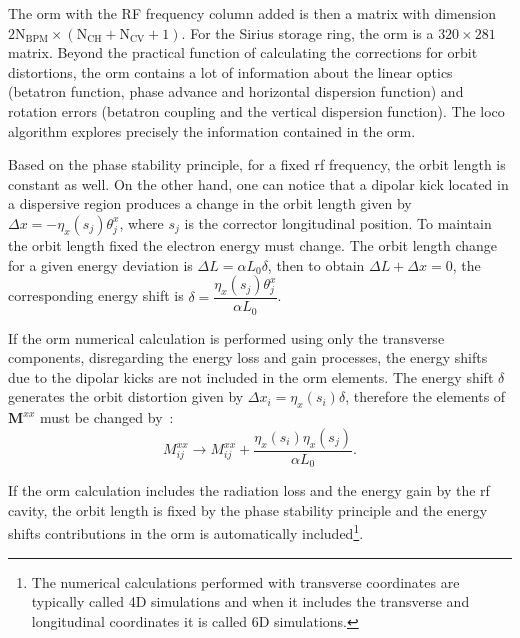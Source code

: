 The \gls{orm} with the RF frequency column added is then a matrix with dimension $2 \mathrm{N}_{\mathrm{BPM}} \times \left(\mathrm{N}_{\mathrm{CH}} + \mathrm{N}_{\mathrm{CV}}+1\right)$. For the Sirius storage ring, the \gls{orm} is a $320 \times 281$ matrix. Beyond the practical function of calculating the corrections for orbit distortions, the \gls{orm} contains a lot of information about the linear optics (betatron function, phase advance and horizontal dispersion function) and rotation errors (betatron coupling and the vertical dispersion function). The \gls{loco} algorithm explores precisely the information contained in the \gls{orm}.

Based on the phase stability principle, for a fixed \gls{rf} frequency, the orbit length is constant as well. On the other hand, one can notice that a dipolar kick located in a dispersive region produces a change in the orbit length given by $\Delta x = -\eta_x(s_j)\theta^x_j$, where $s_j$ is the corrector longitudinal position. To maintain the orbit length fixed the electron energy must change. The orbit length change for a given energy deviation is $\Delta L = \alpha L_0 \delta$, then to obtain $\Delta L + \Delta x = 0$, the corresponding energy shift is $\delta = \dfrac{\eta_x(s_j) \theta^x_j}{\alpha L_0}$. 

If the \gls{orm} numerical calculation is performed using only the transverse components, disregarding the energy loss and gain processes, the energy shifts due to the dipolar kicks are not included in the \gls{orm} elements. The energy shift $\delta$ generates the orbit distortion given by $\Delta x_i = \eta_x(s_i)\delta$, therefore the elements of $\mathbf{M}^{xx}$ must be changed by~\cite{huang2019beam}:
\begin{equation}
    M_{ij}^{xx} \rightarrow M_{ij}^{xx} + \dfrac{\eta_x(s_i)\eta_x(s_j)}{\alpha L_0}.
\end{equation}

If the \gls{orm} calculation includes the radiation loss and the energy gain by the \gls{rf} cavity, the orbit length is fixed by the phase stability principle and the energy shifts contributions in the \gls{orm} is automatically included\footnote{The numerical calculations performed with transverse coordinates are typically called 4D simulations and when it includes the transverse and longitudinal coordinates it is called 6D simulations.}.


